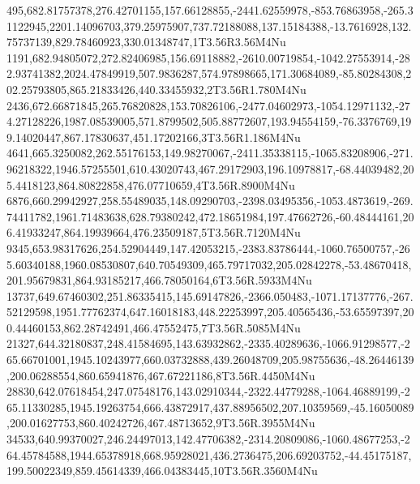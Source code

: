 495,682.81757378,276.42701155,157.66128855,-2441.62559978,-853.76863958,-265.31122945,2201.14096703,379.25975907,737.72188088,137.15184388,-13.7616928,132.75737139,829.78460923,330.01348747,1T3.56R3.56M4Nu
1191,682.94805072,272.82406985,156.69118882,-2610.00719854,-1042.27553914,-282.93741382,2024.47849919,507.9836287,574.97898665,171.30684089,-85.80284308,202.25793805,865.21833426,440.33455932,2T3.56R1.780M4Nu
2436,672.66871845,265.76820828,153.70826106,-2477.04602973,-1054.12971132,-274.27128226,1987.08539005,571.8799502,505.88772607,193.94554159,-76.3376769,199.14020447,867.17830637,451.17202166,3T3.56R1.186M4Nu
4641,665.3250082,262.55176153,149.98270067,-2411.35338115,-1065.83208906,-271.96218322,1946.57255501,610.43020743,467.29172903,196.10978817,-68.44039482,205.4418123,864.80822858,476.07710659,4T3.56R.8900M4Nu
6876,660.29942927,258.55489035,148.09290703,-2398.03495356,-1053.4873619,-269.74411782,1961.71483638,628.79380242,472.18651984,197.47662726,-60.48444161,206.41933247,864.19939664,476.23509187,5T3.56R.7120M4Nu
9345,653.98317626,254.52904449,147.42053215,-2383.83786444,-1060.76500757,-265.60340188,1960.08530807,640.70549309,465.79717032,205.02842278,-53.48670418,201.95679831,864.93185217,466.78050164,6T3.56R.5933M4Nu
13737,649.67460302,251.86335415,145.69147826,-2366.050483,-1071.17137776,-267.52129598,1951.77762374,647.16018183,448.22253997,205.40565436,-53.65597397,200.44460153,862.28742491,466.47552475,7T3.56R.5085M4Nu
21327,644.32180837,248.41584695,143.63932862,-2335.40289636,-1066.91298577,-265.66701001,1945.10243977,660.03732888,439.26048709,205.98755636,-48.26446139,200.06288554,860.65941876,467.67221186,8T3.56R.4450M4Nu
28830,642.07618454,247.07548176,143.02910344,-2322.44779288,-1064.46889199,-265.11330285,1945.19263754,666.43872917,437.88956502,207.10359569,-45.16050089,200.01627753,860.40242726,467.48713652,9T3.56R.3955M4Nu
34533,640.99370027,246.24497013,142.47706382,-2314.20809086,-1060.48677253,-264.45784588,1944.65378918,668.95928021,436.2736475,206.69203752,-44.45175187,199.50022349,859.45614339,466.04383445,10T3.56R.3560M4Nu
